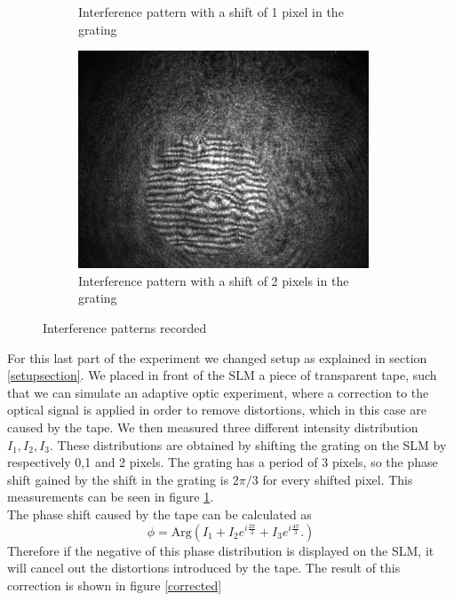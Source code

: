 \documentclass[a4paper,10pt]{article}
\begin{document}
\begin{figure}[H]
\begin{subfigure}[b]{0.3\textwidth}
        \caption{Interference pattern with a shift of 1 pixel in the grating}
    \end{subfigure}
    \begin{subfigure}[b]{0.3\textwidth}
        \includegraphics[width=\textwidth]{3pixel}
        \caption{Interference pattern with a shift of 2 pixels in the grating}
    \end{subfigure}
\caption{Interference patterns recorded}\label{interferencepatterns}
\end{figure}
For this last part of the experiment we changed setup as explained in section \ref{setupsection}. We placed in front of the SLM a piece of transparent tape, such that we can simulate an adaptive optic experiment, where a correction to the optical signal is applied in order to remove distortions, which in this case are caused by the tape. We then measured three different intensity distribution $I_1,I_2,I_3$. These distributions are obtained by shifting the grating on the SLM by respectively 0,1 and 2 pixels. The grating has a period of 3 pixels, so the phase shift gained by the shift in the grating is $2\pi/3$ for every shifted pixel. This measurements can be seen in figure \ref{interferencepatterns}.\\
The phase shift caused by the tape can be calculated as \cite{skriptum}
\begin{equation}\phi = \text{Arg}(I_1 + I_2 e^{i\frac{2\pi}{3}}+I_3 e^{i\frac{4\pi}{3}}.)\end{equation}
Therefore if the negative of this phase distribution is displayed on the SLM, it will cancel out the distortions introduced by the tape. The result of this correction is shown in figure \ref{corrected}
\end{document}
